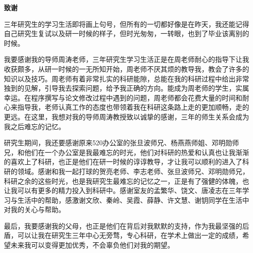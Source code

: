 \begin{center}
	\bf 致谢
\end{center}

三年研究生的学习生活即将画上句号，但所有的一切都好像是在昨天，我还能记得自己研究生复试以及研一时候的样子，但时光匆匆，一转眼，也到了毕业该离别的时候。

我要感谢我的导师周涛老师，三年研究生学习生活正是在周老师耐心的指导下让我收获颇多，从研一时候的一无所知开始，周老师不厌其烦的教导我，教会了许多的知识以及技巧。周老师有着非常扎实的科研能隙，总能在我的科研过程中给出非常独到的见解，引导我去探索问题，给予我正确的方向。能成为周老师的学生，实属幸运。在程序撰写与论文修改过程中遇到的问题，周老师都会花费大量的时间和耐心来指导我，老师认真工作的态度也带领着我在科研这条路上走的更加顺畅，走的更远。在这里，我想对我的导师周涛教授致以诚挚的感谢，三年的师生关系会成为我之后难忘的记忆。

研究生期间，我还要感谢原来520办公室的张旦波师兄、杨燕燕师姐、邓明勋师兄，和他们在一个办公室是我最难忘的时光，他们对科研的热爱和认真也让我渐渐的喜欢上了科研，也正是他们在研一时候的谆谆教导，才让我可以顺利的进入了科研的领域。感谢和我一起打球的贺亮老师、李志老师、张旦波师兄、邓明勋师兄，科研之余的这些时光，也是我研究生最难忘的记忆之一，正是有了强健的体魄，也让我可以有更多的精力投入到科研中。感谢室友的孟繁华、饶文、唐凌志在三年学习与生活中的帮助，感激谢文欣、秦岭、吴霞、薛静、许文慧、谢钥同学在生活中对我的关心与帮助。

最后，我要感谢我的父母，也正是他们在背后对我默默的支持，作为我最坚强的后盾，可以让我在研究生三年中心无旁骛，专心科研，在学术上做出一定的成绩，希望未来我可以变得更加优秀，不会辜负他们对我的期望。






